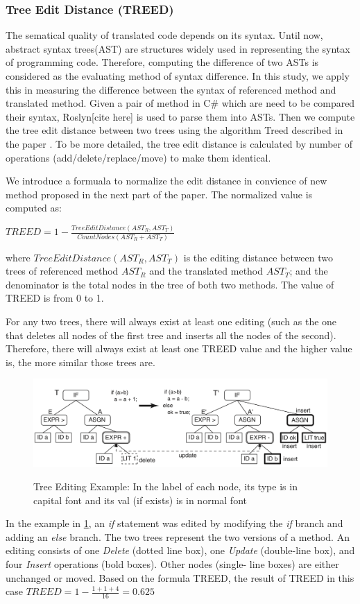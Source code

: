 \subsubsection{\textbf{Tree Edit Distance (TREED)}}  
The sematical quality of translated code depends on its syntax. Until now, abstract syntax trees(AST) are structures widely used in  representing the syntax of programming code. Therefore, computing the difference of two ASTs is considered as the evaluating method of syntax difference.
In this study, we apply this in measuring the difference between the syntax of referenced method and translated method. Given a pair of method in C\# which are need to be compared their syntax, Roslyn[cite here] is used to parse them into ASTs. Then we compute the tree edit distance between two trees using the algorithm Treed described in the paper \cite{algorithm}.
To be more detailed, the tree edit distance is calculated by number of operations (add/delete/replace/move) to make them identical. 

We introduce a formuala to normalize the edit distance in convience of new method proposed in the next part of the paper. The normalized value is computed as:

  $TREED = 1 -  \frac{TreeEditDistance\left(AST_R, AST_T\right)}{CountNodes \left(AST_R+AST_T\right)}$ 
  
where $TreeEditDistance\left(AST_R, AST_T\right)$ is the editing distance between two trees of referenced method $AST_R$ and the translated method $AST_T$; and the denominator is the total nodes in the tree of both two methods. The value of TREED is from 0 to 1. 

For any two trees, there will always exist at least one editing (such as the one that deletes all nodes of the first tree and inserts all the nodes of the second). Therefore, there will always exist at least one TREED value and the higher value is, the more similar those trees are.

\begin{figure}[h]
	\caption{Tree Editing Example: In the label of each node, its type is in capital font and its val (if exists) is in normal font}
	\includegraphics[scale=0.3]{img/treed.png}
	\centering
	\label{fig:treed}
\end{figure}

In the example in  \ref{fig:treed}, an \textit{if} statement was edited by modifying the \textit{if} branch and adding an \textit{else} branch. The two trees represent the two versions of a method. An editing consists of one \textit{Delete} (dotted line box), one \textit{Update} (double-line box), and four \textit{Insert} operations (bold boxes). Other nodes (single- line boxes) are either unchanged or moved. Based on the formula TREED, the result of TREED in this case  $TREED = 1 - \frac{1 + 1 + 4}{16}=0.625$



